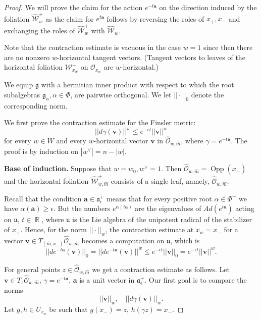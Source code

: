 \documentclass[10pt,a4paper]{amsart}
\DeclareMathOperator{\Opp}{Opp}
\DeclareMathOperator{\R}{\mathbb{R}}
\def\al{\alpha}
\def\ba{\mathbf{a}}
\def\bv{\mathbf{v}}
\def\cO{{\mathscr{O}}}
\def\cW{{\mathscr{W}}}
\def\eps{\epsilon}
\def\ga{\gamma}
\begin{document}
\begin{proof} We will prove the claim for the action $e^{-t\ba}$ on the direction induced by the foliation $\hat{\cW}^+_w$ as the claim for  $e^{t\ba}$ follows by reversing the roles of $x_+, x_-$ and exchanging the roles of $\hat{\cW}^+_w$ with $\hat{\cW}^-_w$. 

Note that the contraction estimate is vacuous in the case $w=1$ since then there are no nonzero $w$-horizontal tangent vectors. 
(Tangent vectors to leaves of the horizontal foliation $\cW^+_{x_w}$ on $\cO_{x_w}$ are $w$-horizontal.) 


We equip ${\mathfrak g}$ with a hermitian inner product with respect to which the root subalgebras ${\mathfrak g}_\al, \al\in \Phi$, 
are pairwise orthogonal. We let $||\cdot||_0$ denote the corresponding norm. 

\medskip 

We first prove the contraction estimate for the Finsler metric:
\begin{equation}\label{eq:contract} 
 ||d\ga (\bv)||^w\leqslant  e^{-\eps t} ||\bv||^w 
\end{equation}
for every $w\in W$ and every $w$-horizontal vector $\bv$ in $\hat{\cO}_{w,\hat{m}}$, where $\gamma = e^{-t \ba}$. 
The proof is by induction on $|w^\vee|=n-|w|$. 

\medskip 
{\bf Base of induction.} Suppose that $w=w_0, w^\vee=1$. Then $\hat{\cO}_{w,\hat{m}}=\Opp(x_+)$ and the horizontal foliation $ \hat{\cW}_{w,\hat{m}}^+$ consists of a single leaf, namely, $\hat{\cO}_{w,\hat{m}}$. 

 
 Recall that the condition $\ba\in \mathfrak{a}^+_{\eps}$ means that for every positive root $\al\in \Phi^+$ we have
 $\al(\ba)\geqslant \eps$. But the numbers  $e^{\al(t\ba)}$ are the eigenvalues of $Ad(e^{t\ba})$ acting on ${\mathfrak u}$, $t\in \R$, where ${\mathfrak u}$ is the Lie algebra of the unipotent radical of the stabilizer of $x_+$.  Hence, for the norm $||\cdot||_w$, the contraction estimate at $x_w=x_-$ for a vector $\bv \in T_{(\hat{m}, x_-)} \hat{\cO}_{w, \hat{m}}$ becomes a computation on ${\mathfrak u}$, which is 
 $$
||de^{-t\ba}(\bv)||_0= ||de^{-t\ba}(\bv)||^w \leqslant e^{-\eps t} ||\bv||_0= e^{-\eps t} ||\bv||^w. 
 $$
 
For general points $z\in \hat{\cO}_{w, \hat{m}}$ we get a contraction estimate as 
follows. Let $\bv\in T_z \hat{\cO}_{w, \hat{m}}$, $\ga=e^{-t\ba}$, $\ba$ is a unit vector in $\mathfrak{a}_\eps^+$. Our first goal is to compare the norms 
$$
||\bv||_w, \quad ||d\ga (\bv)||_w. 
$$
Let $g, h\in U_{x_w}$ be such that $g(x_-)=z$, $h(\ga z)=x_-$. 


\end{proof}
\end{document}
